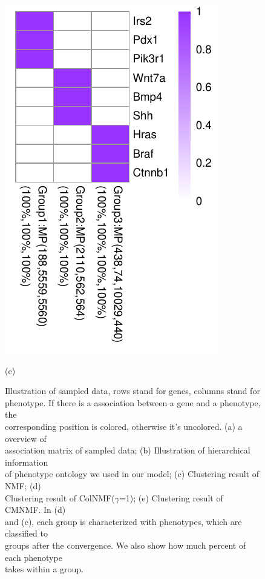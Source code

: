 \documentclass{bmcart}
\begin{document}
\begin{figure}[!h]
\begin{minipage}{.3\linewidth}
   \includegraphics[width=\linewidth]{DrawPictures/v4.pdf}
    \centerline{(e)}
  \end{minipage}
  \caption{Illustration of sampled data, rows stand for genes, columns stand for \protect\\
  phenotype. If there is a association between a gene and a phenotype, the \protect \\
  corresponding position is colored, otherwise it's uncolored. (a) a overview of \protect \\
  association matrix of sampled data; (b) Illustration of hierarchical information \protect \\
  of phenotype ontology we used in our model; (c) Clustering result of NMF; (d)\protect \\
  Clustering result of ColNMF($\gamma$=1); (e) Clustering result of CMNMF. In (d) \protect \\
  and (e), each group is characterized with phenotypes, which are classified to\protect \\
  groups after the convergence. We also show how much percent of each phenotype \protect \\
  takes within a group.}
  \label{fig:sampled_result}
\end{figure}
\end{document}
